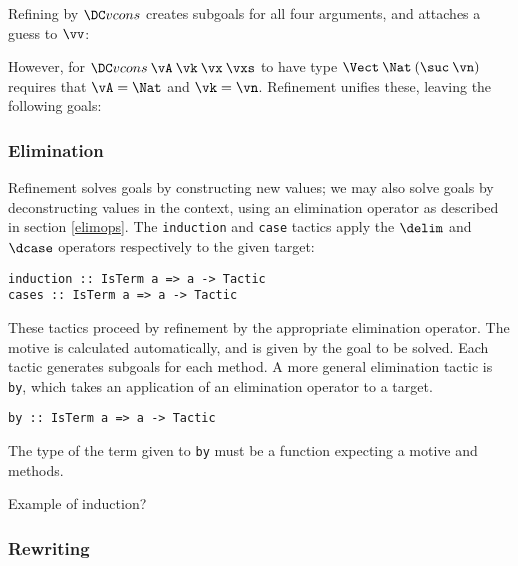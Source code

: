 Refining by $\Vcons$ creates subgoals for all four arguments, and
attaches a guess to $\vv$:
\DM{
\AR{
\hole{\vA}{\Type}\\
\hole{\vk}{\Nat}\\
\hole{\vx}{\vA}\\
\hole{\vxs}{\Vect\:\vA\:\vk}\\
\guess{\vv}{\Vect\:\Nat\:(\suc\:\vn)}{\Vcons\:\vA\:\vk\:\vx\:\vxs}
}
}

However, for $\Vcons\:\vA\:\vk\:\vx\:\vxs$ to have type
$\Vect\:\Nat\:(\suc\:\vn)$ requires that $\vA=\Nat$ and $\vk=\vn$.
Refinement unifies these, leaving the
following goals:
\DM{
\AR{
\hole{\vx}{\Nat}\\
\hole{\vxs}{\Vect\:\Nat\:\vn}\\
\guess{\vv}{\Vect\:\Nat\:(\suc\:\vn)}{\Vcons\:\Nat\:\vn\:\vx\:\vxs}
}
}

\subsubsection{Elimination}

Refinement solves goals by constructing new values; we may also solve
goals by deconstructing values in the context, using an elimination
operator as described in section \ref{elimops}. The \texttt{induction}
and \texttt{case} tactics apply the $\delim$ and $\dcase$ operators
respectively to the given target:

\begin{verbatim}
induction :: IsTerm a => a -> Tactic
cases :: IsTerm a => a -> Tactic
\end{verbatim}

These tactics proceed by refinement by the appropriate elimination
operator. The motive is calculated automatically, and is given by the
goal to be solved. Each tactic generates subgoals for each method.
A more general elimination tactic is \texttt{by}, which takes an
application of an elimination operator to a target.

\begin{verbatim}
by :: IsTerm a => a -> Tactic
\end{verbatim}

The type of the term given to \texttt{by} must be a function expecting
a motive and methods.

Example of induction?

\subsubsection{Rewriting}

